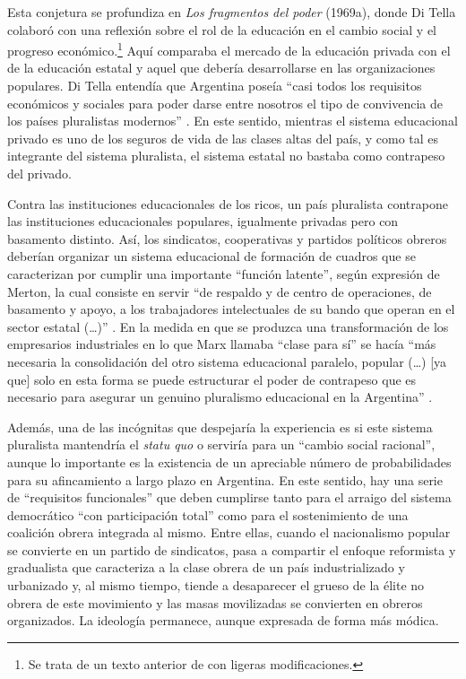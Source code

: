 Esta conjetura se profundiza en \emph{Los fragmentos del poder} (1969a), donde Di Tella colaboró con una reflexión sobre el rol de la educación en el cambio social y el progreso económico.\footnote{Se trata de un texto anterior de \textcite{1658-DITELLA1966} con ligeras modificaciones.} Aquí comparaba el mercado de la educación privada con el de la educación estatal y aquel que debería desarrollarse en las organizaciones populares. Di Tella entendía que Argentina poseía \enquote{casi todos los requisitos económicos y sociales para poder darse entre nosotros el tipo de convivencia de los países pluralistas modernos} \parencite[318]{1659-DITELLA1969}. En este sentido, mientras el sistema educacional privado es uno de los seguros de vida de las clases altas del país, y como tal es integrante del sistema pluralista, el sistema estatal no bastaba como contrapeso del privado.

Contra las instituciones educacionales de los ricos, un país pluralista contrapone las instituciones educacionales populares, igualmente privadas pero con basamento distinto. Así, los sindicatos, cooperativas y partidos políticos obreros deberían organizar un sistema educacional de formación de cuadros que se caracterizan por cumplir una importante \enquote{función latente}, según expresión de Merton, la cual consiste en servir \enquote{de respaldo y de centro de operaciones, de basamento y apoyo, a los trabajadores intelectuales de su bando que operan en el sector estatal (\dots)} \parencite[319]{1659-DITELLA1969}. En la medida en que se produzca una transformación de los empresarios industriales en lo que Marx llamaba \enquote{clase para sí} se hacía \enquote{más necesaria la consolidación del otro sistema educacional paralelo, popular (\dots) [ya que] solo en esta forma se puede estructurar el poder de contrapeso que es necesario para asegurar un genuino pluralismo educacional en la Argentina} \parencite[322-323]{1659-DITELLA1969}.

Además, una de las incógnitas que despejaría la experiencia es si este sistema pluralista mantendría el \emph{statu quo} o serviría para un \enquote{cambio social racional}, aunque lo importante es la existencia de un apreciable número de probabilidades para su afincamiento a largo plazo en Argentina. En este sentido, hay una serie de \enquote{requisitos funcionales} que deben cumplirse tanto para el arraigo del sistema democrático \enquote{con participación total} como para el sostenimiento de una coalición obrera integrada al mismo. Entre ellas, cuando el nacionalismo popular se convierte en un partido de sindicatos, pasa a compartir el enfoque reformista y gradualista que caracteriza a la clase obrera de un país industrializado y urbanizado y, al mismo tiempo, tiende a desaparecer el grueso de la élite no obrera de este movimiento y las masas movilizadas se convierten en obreros organizados. La ideología permanece, aunque expresada de forma más módica.

